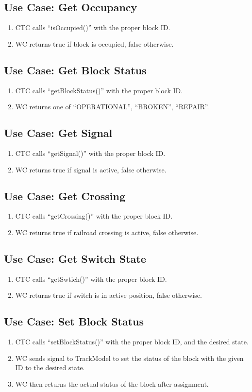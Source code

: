 \documentclass{scrreprt}
\begin{document}
\providecommand{\use}[1]{\subsection{Use Case: #1}}

    \use{Get Occupancy}
    \begin{enumerate}
        \item CTC calls ``isOccupied()'' with the proper block ID.
        \item WC returns true if block is occupied, false otherwise.
    \end{enumerate}

    \use{Get Block Status}
    \begin{enumerate}
        \item CTC calls ``getBlockStatus()'' with the proper block ID.
        \item WC returns one of ``OPERATIONAL'', ``BROKEN'', ``REPAIR''.
    \end{enumerate}

    \use{Get Signal}
    \begin{enumerate}
        \item CTC calls ``getSignal()'' with the proper block ID.
        \item WC returns true if signal is active, false otherwise.
    \end{enumerate}

    \use{Get Crossing}
    \begin{enumerate}
        \item CTC calls ``getCrossing()'' with the proper block ID.
        \item WC returns true if railroad crossing is active, false otherwise.
    \end{enumerate}

    \use{Get Switch State}
    \begin{enumerate}
        \item CTC calls ``getSwtich()'' with the proper block ID.
        \item WC returns true if switch is in active position, false otherwise.
    \end{enumerate}

    \use{Set Block Status}
    \begin{enumerate}
        \item CTC calls ``setBlockStatus()'' with the proper block ID, and the desired state.
        \item WC sends signal to TrackModel to set the status of the block with the given ID to the desired state.
        \item WC then returns the actual status of the block after assignment.
    \end{enumerate}
\end{document}
